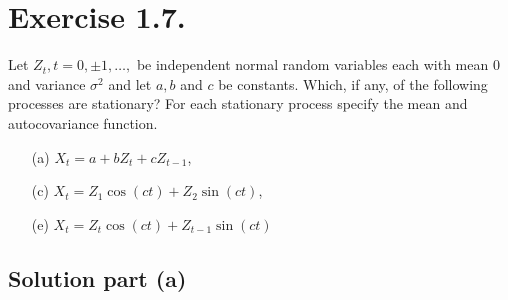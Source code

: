 \section*{Exercise 1.7.}

Let $Z_t, t= 0,\pm 1, \ldots,$ be independent normal random variables each with mean 0 and variance $\sigma^2$ and let $a,b$ and $c$ be constants. Which, if any, of the following processes are stationary? For each stationary process specify the mean and autocovariance function.
\begin{enumerate}
    \item[(a)] $X_t = a + bZ_t + cZ_{t-1}$,
    \item[(c)] $X_t = Z_1 \cos(ct) + Z_2 \sin(ct)$,
    \item[(e)] $X_t = Z_t \cos(ct) + Z_{t-1}\sin(ct)$ 
\end{enumerate}

\subsection*{Solution part (a)}
